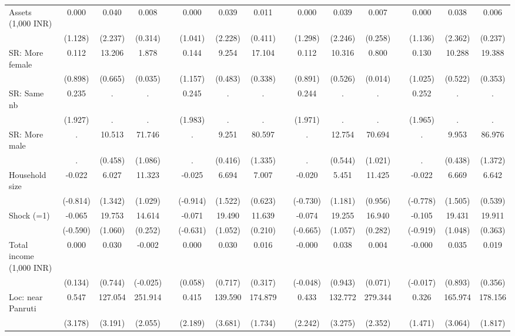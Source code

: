 {\begin{longtable}{@{\extracolsep{\fill}}lccccccccccccccc}
    Assets (1,000 INR) & 0.000 & 0.040 & 0.008 &   & 0.000 & 0.039 & 0.011 &   & 0.000 & 0.039 & 0.007 &   & 0.000 & 0.038 & 0.006 \\
      & (1.128) & (2.237) & (0.314) &   & (1.041) & (2.228) & (0.411) &   & (1.298) & (2.246) & (0.258) &   & (1.136) & (2.362) & (0.237) \\
    SR: More female & 0.112 & 13.206 & 1.878 &   & 0.144 & 9.254 & 17.104 &   & 0.112 & 10.316 & 0.800 &   & 0.130 & 10.288 & 19.388 \\
      & (0.898) & (0.665) & (0.035) &   & (1.157) & (0.483) & (0.338) &   & (0.891) & (0.526) & (0.014) &   & (1.025) & (0.522) & (0.353) \\
    SR: Same nb & 0.235 & . & . &   & 0.245 & . & . &   & 0.244 & . & . &   & 0.252 & . & . \\
      & (1.927) & . & . &   & (1.983) & . & . &   & (1.971) & . & . &   & (1.965) & . & . \\
    SR: More male & . & 10.513 & 71.746 &   & . & 9.251 & 80.597 &   & . & 12.754 & 70.694 &   & . & 9.953 & 86.976 \\
      & . & (0.458) & (1.086) &   & . & (0.416) & (1.335) &   & . & (0.544) & (1.021) &   & . & (0.438) & (1.372) \\
    Household size & -0.022 & 6.027 & 11.323 &   & -0.025 & 6.694 & 7.007 &   & -0.020 & 5.451 & 11.425 &   & -0.022 & 6.669 & 6.642 \\
      & (-0.814) & (1.342) & (1.029) &   & (-0.914) & (1.522) & (0.623) &   & (-0.730) & (1.181) & (0.956) &   & (-0.778) & (1.505) & (0.539) \\
    Shock (=1) & -0.065 & 19.753 & 14.614 &   & -0.071 & 19.490 & 11.639 &   & -0.074 & 19.255 & 16.940 &   & -0.105 & 19.431 & 19.911 \\
      & (-0.590) & (1.060) & (0.252) &   & (-0.631) & (1.052) & (0.210) &   & (-0.665) & (1.057) & (0.282) &   & (-0.919) & (1.048) & (0.363) \\
    Total income (1,000 INR) & 0.000 & 0.030 & -0.002 &   & 0.000 & 0.030 & 0.016 &   & -0.000 & 0.038 & 0.004 &   & -0.000 & 0.035 & 0.019 \\
      & (0.134) & (0.744) & (-0.025) &   & (0.058) & (0.717) & (0.317) &   & (-0.048) & (0.943) & (0.071) &   & (-0.017) & (0.893) & (0.356) \\
    Loc: near Panruti & 0.547 & 127.054 & 251.914 &   & 0.415 & 139.590 & 174.879 &   & 0.433 & 132.772 & 279.344 &   & 0.326 & 165.974 & 178.156 \\
      & (3.178) & (3.191) & (2.055) &   & (2.189) & (3.681) & (1.734) &   & (2.242) & (3.275) & (2.352) &   & (1.471) & (3.064) & (1.817) \\

\end{longtable}}
